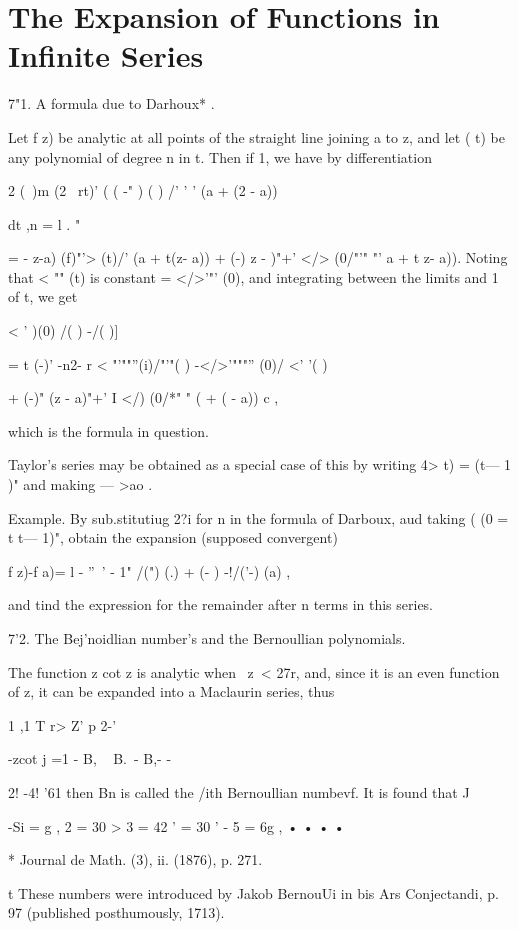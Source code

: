 \chapter{The Expansion of Functions in Infinite Series} 

7"1. A formula due to Darhoux* .

Let f z) be analytic at all points of the straight line joining a to
z, and let ( t) be any polynomial of degree n in t. Then if 1, we have
by differentiation

2 (\ )m (2 \ rt)' ( ( -" ) ( ) /' ' ' (a + (2 - a))

dt ,n = l . "

= - z-a) (f)"'> (t)/' (a + t(z- a)) + (-) z - )"+' </> (0/"'" "' a + t
z- a)). Noting that < "" (t) is constant = </>'"' (0), and integrating
between the limits and 1 of t, we get

< ' )(0) /( ) -/( )]

= t (-)' -n2- r < "'""''(i)/"'"( ) -</>'"""'' (0)/ <' '( )

+ (-)" (z - a)"+' I </) (0/*" " ( + ( - a)) c ,

which is the formula in question.

Taylor's series may be obtained as a special case of this by writing
4> t) = (t— 1 )" and making — >ao .

Example. By sub.stitutiug 2?i for n in the formula of Darboux, aud
taking ( (0 = t t— 1)", obtain the expansion (supposed convergent)

f z)-f a)= l - ''~' - 1" /(") (.) + (- ) -!/('-) (a) ,

and tind the expression for the remainder after n terms in this
series.

7'2. The Bej'noidlian number's and the Bernoullian polynomials.

The function z cot z is analytic when \ z\ < 27r, and, since it is an
even function of z, it can be expanded into a Maclaurin series, thus

1 ,1 T r> Z' p 2-'

-zcot j =1 - B, ~ B.~- B,- -

2! -4! '61 then Bn is called the /ith Bernoullian numbevf. It is found
that J

-Si = g , 2 = 30 > 3 = 42 ' = 30 ' - 5 = 6g , • • • •

* Journal de Math. (3), ii. (1876), p. 271.

t These numbers were introduced by Jakob BernouUi in bis Ars
Conjectandi, p. 97 (published posthumously, 1713).

